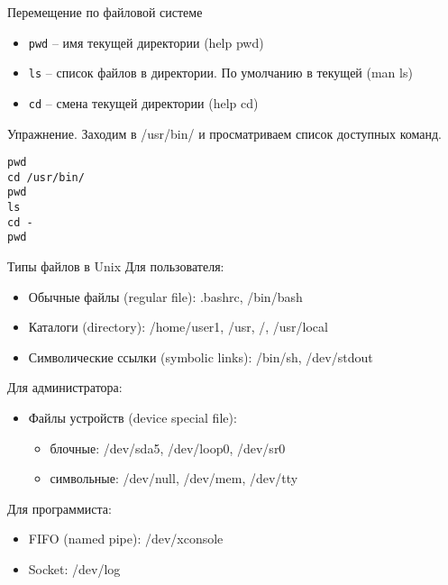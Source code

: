 \begin{frame}[fragile]{Перемещение по файловой системе}
      \begin{itemize}
		  \item {\tt pwd} -- имя текущей директории (help pwd)
		  \item {\tt ls} -- список файлов в директории. По умолчанию в текущей (man ls)
		  \item {\tt cd} -- смена текущей директории (help cd)
      \end{itemize}
      \begin{block}{Упражнение. Заходим в /usr/bin/ и просматриваем список доступных команд.}
\begin{lstlisting}
pwd
cd /usr/bin/
pwd
ls
cd -
pwd
\end{lstlisting}
      \end{block}
\end{frame}


%
%
%
%
%
%

\begin{frame}{Типы файлов в Unix}
  Для пользователя:
  \begin{itemize}
    \item \alert{Обычные файлы (regular file)}: .bashrc, /bin/bash
    \item \alert{Каталоги (directory)}: /home/user1, /usr, /, /usr/local  \pause
    \item \alert{Символические ссылки (symbolic links)}: /bin/sh, /dev/stdout
  \end{itemize} \pause
  Для администратора:
  \begin{itemize}
    \item \alert{Файлы устройств (device special file)}:
      \begin{itemize}
        \item \alert{блочные}: /dev/sda5, /dev/loop0, /dev/sr0
        \item \alert{символьные}: /dev/null, /dev/mem, /dev/tty
      \end{itemize}
  \end{itemize} \pause
  Для программиста:
  \begin{itemize}
    \item \alert{FIFO (named pipe)}: /dev/xconsole
    \item \alert{Socket}: /dev/log
  \end{itemize}

\end{frame}

